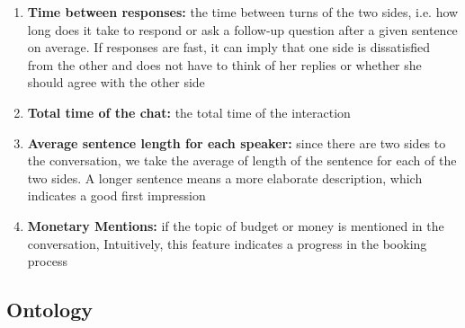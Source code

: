 \begin{enumerate}
\item {\bf Time between responses: } the time between 
turns of the two sides, i.e. how long does it take to respond or ask a follow-up 
question after a given sentence on average. 
If responses are fast, it can imply that one side is dissatisfied 
from the other and does not have to think of her replies or whether 
she should agree with the other side\label{itm:between}

\item {\bf Total time of the chat: } the total time of the interaction \label{itm:total}

\item {\bf Average sentence length for each speaker: } since there are two sides to the conversation, 
we take the average of length of the sentence for each of the two sides. 
A longer sentence means a more elaborate description, which indicates 
a good first impression\label{itm:sent}


\item {\bf Monetary Mentions: } if the topic of budget or money is mentioned in the conversation, 
Intuitively, this feature indicates a progress in the booking process\label{itm:budget}

\end{enumerate} 

\subsection{Ontology}

